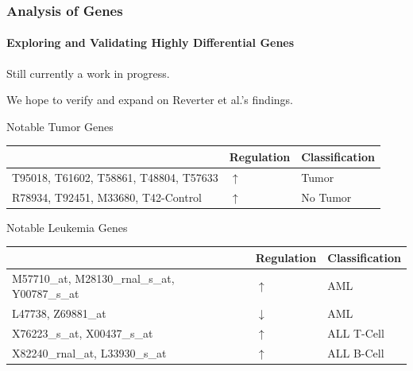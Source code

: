 \documentclass[serif]{beamer}
\begin{document}
	\begin{frame}[t]
		\frametitle{Analysis of Genes}
		\framesubtitle{Exploring and Validating Highly Differential Genes}
		\begin{block}{\vspace{-0.5in}}
			\alert{Still currently a work in progress.}
		\end{block}
		We hope to verify and expand on Reverter et al.'s findings.
		
		{
			\begin{block}{Notable Tumor Genes}
				
				\begin{table}
				\begin{tabular}
				{
					|>{\centering\arraybackslash}m{1.50in}
					|>{\centering\arraybackslash}m{1.00in}
					|>{\centering\arraybackslash}m{1.00in}|
				}
					\hline
						~ &
						\textbf{Regulation} &
						\textbf{Classification}
					\\
					\hline
						T95018, T61602, T58861, T48804,
						T57633 &
						\textbf{$\uparrow$} &
						Tumor
					\\
					\hline
						R78934, T92451, M33680, T42-Control &
						\textbf{$\uparrow$} &
						No Tumor
					\\
					\hline
				\end{tabular}
			\end{table}
				
			\end{block}
		}
		
		\only<3>
		{
			\begin{block}{Notable Leukemia Genes}
				\begin{table}
				\begin{tabular}
				{
					|>{\centering\arraybackslash}m{1.50in}
					|>{\centering\arraybackslash}m{1.00in}
					|>{\centering\arraybackslash}m{1.00in}|
				}
					\hline
						~ &
						\textbf{Regulation} &
						\textbf{Classification}
					\\
					\hline
						M57710\_at,
						M28130\_rnal\_s\_at,
						Y00787\_s\_at &
						\textbf{$\uparrow$} &
						AML
					\\
					\hline
						L47738, Z69881\_at &
						\textbf{$\downarrow$} &
						AML
					\\
					\hline
						X76223\_s\_at, X00437\_s\_at &
						\textbf{$\uparrow$} &
						ALL T-Cell
					\\
					\hline
						X82240\_rnal\_at, L33930\_s\_at &
						\textbf{$\uparrow$} &
						ALL B-Cell
					\\
					\hline
				\end{tabular}
				\end{table}
			\end{block}
		}
		

\end{frame}
\end{document}
